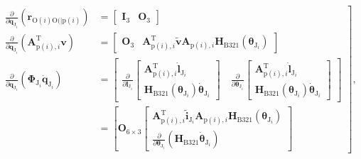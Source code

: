 \[
\left.\begin{array}{rl}
\frac{\partial}{\partial \boldsymbol{q}_{\mathrm{J}_{i}}}\left(\boldsymbol{r}_{\mathrm{O}(i) \mathrm{O}(\mid \mathrm{p}(i)}\right) & =\left[\begin{array}{ll}
\boldsymbol{I}_{3} & \boldsymbol{O}_{3}
\end{array}\right] \\
\frac{\partial}{\partial \boldsymbol{q}_{\mathrm{J}_{i}}}\left(\boldsymbol{A}_{\mathrm{p}(i), i}^{\mathrm{T}} \boldsymbol{v}\right) & =\left[\begin{array}{ll}
\boldsymbol{O}_{3} & \boldsymbol{A}_{\mathrm{p}(i), i}^{\mathrm{T}} \tilde{\boldsymbol{v}} \boldsymbol{A}_{\mathrm{p}(i), i} \boldsymbol{H}_{\mathrm{B} 321}\left(\boldsymbol{\theta}_{\mathrm{J}_{i}}\right)
\end{array}\right] \\
\frac{\partial}{\partial \boldsymbol{q}_{\mathrm{J}_{i}}}\left(\boldsymbol{\Phi}_{\mathrm{J}_{i}} \dot{\boldsymbol{q}}_{\mathrm{J}_{i}}\right) & =\left[\begin{array}{ll}
\frac{\partial}{\partial \boldsymbol{l}_{\mathrm{J}_{i}}}\left[\begin{array}{c}
\boldsymbol{A}_{\mathrm{p}(i), i}^{\mathrm{T}} \dot{\boldsymbol{l}}_{\mathrm{J}_{i}} \\
\boldsymbol{H}_{\mathrm{B} 321}\left(\boldsymbol{\theta}_{\mathrm{J}_{i}}\right) \dot{\boldsymbol{\theta}}_{\mathrm{J}_{i}}
\end{array}\right] \quad \frac{\partial}{\partial \boldsymbol{\theta}_{\mathrm{J}_{i}}}\left[\begin{array}{c}
\boldsymbol{A}_{\mathrm{p}(i), i}^{\mathrm{T}} \dot{\boldsymbol{l}}_{\mathrm{J}_{i}} \\
\boldsymbol{H}_{\mathrm{B} 321}\left(\boldsymbol{\theta}_{\mathrm{J}_{i}}\right) \dot{\boldsymbol{\theta}}_{\mathrm{J}_{i}}
\end{array}\right]
\end{array}\right] \\
& =\left[\boldsymbol{O}_{6 \times 3}\left[\begin{array}{c}
\boldsymbol{A}_{\mathrm{p}(i), i}^{\mathrm{T}} \tilde{\boldsymbol{i}}_{\mathrm{J}_{i}} \boldsymbol{A}_{\mathrm{p}(i), i} \boldsymbol{H}_{\mathrm{B} 321}\left(\boldsymbol{\theta}_{\mathrm{J}_{i}}\right) \\
\frac{\partial}{\partial \boldsymbol{\theta}_{\mathrm{J}_{i}}}\left(\boldsymbol{H}_{\mathrm{B} 321} \dot{\boldsymbol{\theta}}_{\mathrm{J}_{i}}\right)
\end{array}\right]\right.
\end{array}\right],
\]

